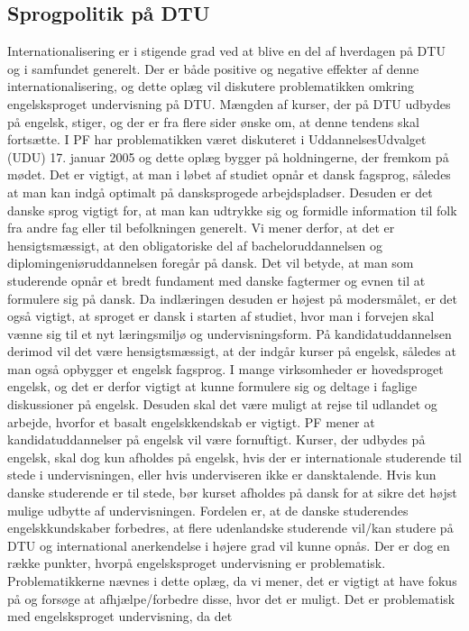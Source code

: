 \subsection{Sprogpolitik på DTU}
Internationalisering er i stigende grad ved at blive en del af hverdagen på DTU og i samfundet generelt. Der er både
positive og negative effekter af denne internationalisering, og dette oplæg vil diskutere problematikken omkring
engelsksproget undervisning på DTU.
Mængden af kurser, der på DTU udbydes på engelsk, stiger, og der er fra flere sider ønske om, at denne tendens skal
fortsætte. I PF har problematikken været diskuteret i UddannelsesUdvalget (UDU) 17. januar 2005 og dette oplæg
bygger på holdningerne, der fremkom på mødet.
Det er vigtigt, at man i løbet af studiet opnår et dansk fagsprog, således at man kan indgå optimalt på dansksprogede
arbejdspladser. Desuden er det danske sprog vigtigt for, at man kan udtrykke sig og formidle information til folk fra
andre fag eller til befolkningen generelt. Vi mener derfor, at det er hensigtsmæssigt, at den obligatoriske del af
bacheloruddannelsen og diplomingeniøruddannelsen foregår på dansk. Det vil betyde, at man som studerende opnår et
bredt fundament med danske fagtermer og evnen til at formulere sig på dansk. Da indlæringen desuden er højest på
modersmålet, er det også vigtigt, at sproget er dansk i starten af studiet, hvor man i forvejen skal vænne sig til et nyt
læringsmiljø og undervisningsform.
På kandidatuddannelsen derimod vil det være hensigtsmæssigt, at der indgår kurser på engelsk, således at man også
opbygger et engelsk fagsprog. I mange virksomheder er hovedsproget engelsk, og det er derfor vigtigt at kunne
formulere sig og deltage i faglige diskussioner på engelsk. Desuden skal det være muligt at rejse til udlandet og arbejde,
hvorfor et basalt engelskkendskab er vigtigt.
PF mener at kandidatuddannelser på engelsk vil være fornuftigt. Kurser, der udbydes på engelsk, skal dog kun afholdes
på engelsk, hvis der er internationale studerende til stede i undervisningen, eller hvis underviseren ikke er dansktalende.
Hvis kun danske studerende er til stede, bør kurset afholdes på dansk for at sikre det højst mulige udbytte af
undervisningen.
Fordelen er, at de danske studerendes engelskkundskaber forbedres, at flere udenlandske studerende vil/kan studere på
DTU og international anerkendelse i højere grad vil kunne opnås. Der er dog en række punkter, hvorpå engelsksproget
undervisning er problematisk. Problematikkerne nævnes i dette oplæg, da vi mener, det er vigtigt at have fokus på og
forsøge at afhjælpe/forbedre disse, hvor det er muligt. Det er problematisk med engelsksproget undervisning, da det
